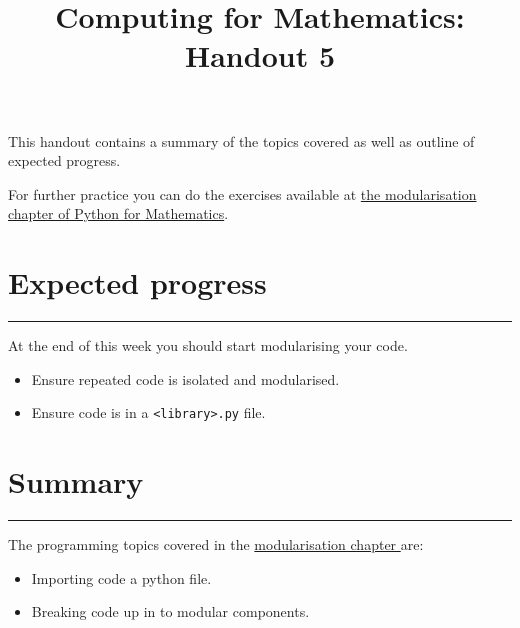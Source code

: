 \documentclass{article}
\title{Computing for Mathematics: Handout 5}
\date{}
\begin{document}
\maketitle


This handout contains a summary of the topics covered as well as outline of
expected progress.

For further practice you can do the exercises available at 
\href{https://vknight.org/pfm/building-tools/05-modularisation/exercises/main.html}{the
modularisation chapter of Python for Mathematics}.

\section{Expected progress}
\hrule

At the end of this week you should start modularising your code.

\begin{itemize}
    \item Ensure repeated code is isolated and modularised.
    \item Ensure code is in a \texttt{<library>.py} file.
\end{itemize}

\begin{center}
\end{center}

\section{Summary}\label{summary}
\hrule

The programming topics covered in the
\href{https://vknight.org/pfm/building-tools/05-modularisation/introduction/main.html}{modularisation
chapter
} are:


\begin{itemize}
\item Importing code a python file.
  \item Breaking code up in to modular components.
\end{itemize}
\end{document}

